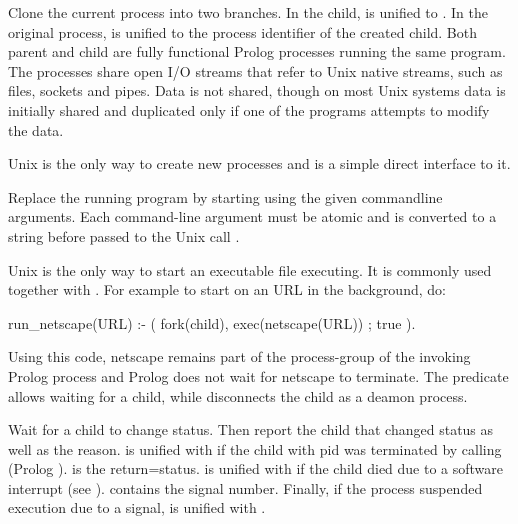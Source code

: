 \documentclass[11pt]{article}
\begin{document}
\begin{description}
Clone the current process into two branches. In the child,  is
unified to . In the original process,  is unified
to the process identifier of the created child.  Both parent and child
are fully functional Prolog processes running the same program.  The
processes share open I/O streams that refer to Unix native streams, such
as files, sockets and pipes. Data is not shared, though on most Unix
systems data is initially shared and duplicated only if one of the
programs attempts to modify the data.

Unix  is the only way to create new processes and 
is a simple direct interface to it.

Replace the running program by starting  using the given
commandline arguments. Each command-line argument must be atomic and is
converted to a string before passed to the Unix call .

Unix  is the only way to start an executable file
executing.  It is commonly used together with .  For example to
start  on an URL in the background, do:

\begin{code}
run_netscape(URL) :-
        (    fork(child),
             exec(netscape(URL))
        ;    true
        ).
\end{code}

\noindent
Using this code, netscape remains part of the process-group of the
invoking Prolog process and Prolog does not wait for netscape to
terminate.  The predicate  allows waiting for a child, while
 disconnects the child as a deamon process.

Wait for a child to change status. Then report the child that changed
status as well as the reason.  is unified with
 if the child with pid  was terminated
by calling  (Prolog ).  is the
return=status.  is unified with  if
the child died due to a software interrupt (see ). 
contains the signal number. Finally, if the process suspended execution
due to a signal,  is unified with .


\end{description}
\end{document}
